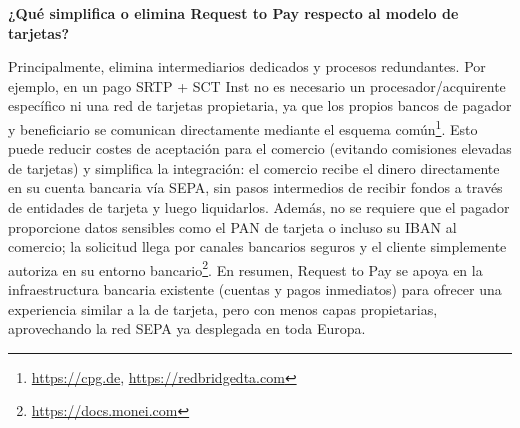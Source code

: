 \bigskip

\noindent\textbf{¿Qué simplifica o elimina Request to Pay respecto al modelo de tarjetas?}

Principalmente, elimina intermediarios dedicados y procesos redundantes. Por ejemplo, en un pago SRTP + SCT Inst no es necesario un procesador/acquirente específico ni una red de tarjetas propietaria, ya que los propios bancos de pagador y beneficiario se comunican directamente mediante el esquema común\footnote{\url{https://cpg.de}, \url{https://redbridgedta.com}}. Esto puede reducir costes de aceptación para el comercio (evitando comisiones elevadas de tarjetas) y simplifica la integración: el comercio recibe el dinero directamente en su cuenta bancaria vía SEPA, sin pasos intermedios de recibir fondos a través de entidades de tarjeta y luego liquidarlos. Además, no se requiere que el pagador proporcione datos sensibles como el PAN de tarjeta o incluso su IBAN al comercio; la solicitud llega por canales bancarios seguros y el cliente simplemente autoriza en su entorno bancario\footnote{\url{https://docs.monei.com}}. En resumen, Request to Pay se apoya en la infraestructura bancaria existente (cuentas y pagos inmediatos) para ofrecer una experiencia similar a la de tarjeta, pero con menos capas propietarias, aprovechando la red SEPA ya desplegada en toda Europa.



